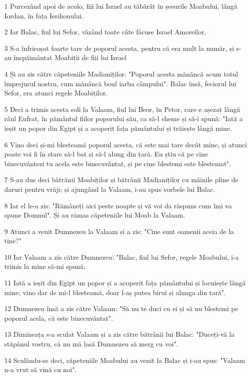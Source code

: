 \par 1 Purcezând apoi de acolo, fiii lui Israel au tăbărât în șesurile Moabului, lângă Iordan, în fața Ierihonului.
\par 2 Iar Balac, fiul lui Sefor, văzând toate câte făcuse Israel Amoreilor,
\par 3 S-a înfricoșat foarte tare de poporul acesta, pentru că era mult la număr, și s-au înspăimântat Moabiții de fiii lui Israel
\par 4 Și au zis către căpeteniile Madianiților: "Poporul acesta mănâncă acum totul împrejurul nostru, cum mănâncă boul iarba câmpului". Balac însă, feciorul lui Sefor, era atunci regele Moabiților.
\par 5 Deci a trimis acesta soli la Valaam, fiul lui Beor, în Petor, care e așezat lângă râul Eufrat, în pământul fiilor poporului său, ca să-l cheme și să-i spună: "Iată a ieșit un popor din Egipt și a acoperit fața pământului și trăiește lângă mine.
\par 6 Vino deci și-mi blesteamă poporul acesta, că este mai tare decât mine, și atunci poate voi fi în stare să-l bat și să-l alung din țară. Eu știu că pe cine binecuvântezi tu acela este binecuvântat, și pe cine blestemi este blestemat".
\par 7 S-au dus deci bătrânii Moabiților și bătrânii Madianiților cu mâinile pline de daruri pentru vrăji; și ajungând la Valaam, i-au spus vorbele lui Balac.
\par 8 Iar el le-a zis: "Rămâneți aici peste noapte și vă voi da răspuns cum îmi va spune Domnul". Și au rămas căpeteniile lui Moab la Valaam.
\par 9 Atunci a venit Dumnezeu la Valaam și a zis: "Cine sunt oamenii aceia de la tine?"
\par 10 Iar Valaam a zis către Dumnezeu: "Balac, fiul lui Sefor, regele Moabului, i-a trimis la mine să-mi spună:
\par 11 Iată a ieșit din Egipt un popor și a acoperit fața pământului și locuiește lângă mine; vino dar de mi-l blesteamă, doar l-aș putea birui și alunga din țară".
\par 12 Dumnezeu însă a zis către Valaam: "Să nu te duci cu ei și să nu blestemi pe poporul acela, că este binecuvântat".
\par 13 Dimineața s-a sculat Valaam și a zis către bătrânii lui Balac: "Duceți-vă la stăpânul vostru, că nu mă lasă Dumnezeu să merg cu voi".
\par 14 Sculându-se deci, căpeteniile Moabului au venit la Balac și i-au spus: "Valaam n-a vrut să vină cu noi".
